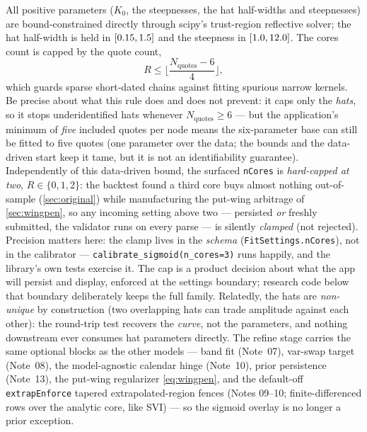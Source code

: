 \documentclass[11pt]{article}
\begin{document}
All positive parameters ($K_0$, the steepnesses, the hat half-widths and
steepnesses) are bound-constrained directly through scipy's trust-region
reflective solver; the hat half-width is held in $[0.15,1.5]$ and the
steepness in $[1.0,12.0]$. The cores count is capped by the
quote count,
\begin{equation}
R\le\Big\lfloor\frac{N_{\text{quotes}}-6}{4}\Big\rfloor,
\label{eq:identifiability}
\end{equation}
which guards sparse short-dated chains against fitting spurious narrow
kernels. Be precise about what this rule does and does not prevent: it caps
only the \emph{hats}, so it stops underidentified hats whenever
$N_{\text{quotes}}\ge6$ --- but the application's minimum of \emph{five}
included quotes per node means the six-parameter base can still be fitted to
five quotes (one parameter over the data; the bounds and the data-driven
start keep it tame, but it is not an identifiability guarantee). Independently
of this data-driven bound, the surfaced \texttt{nCores} is \emph{hard-capped
at two}, $R\in\{0,1,2\}$: the backtest found a third core buys almost nothing
out-of-sample (\cref{sec:original}) while manufacturing the put-wing arbitrage
of \cref{sec:wingpen}, so any incoming setting above two --- persisted
\emph{or} freshly submitted, the validator runs on every parse --- is silently
\emph{clamped} (not rejected). Precision matters here: the clamp lives in the
\emph{schema} (\texttt{FitSettings.nCores}), not in the calibrator ---
\texttt{calibrate\_sigmoid(n\_cores=3)} runs happily, and the library's own
tests exercise it. The cap is a product decision about what the app will
persist and display, enforced at the settings boundary; research code below
that boundary deliberately keeps the full family. Relatedly, the hats are
\emph{non-unique} by construction (two overlapping hats can trade amplitude
against each other): the round-trip test recovers the \emph{curve}, not the
parameters, and nothing downstream ever consumes hat parameters directly. The
refine stage carries the same optional blocks as the other models --- band fit
(Note~07), var-swap target (Note~08), the model-agnostic calendar hinge
(Note~10), prior persistence (Note~13), the put-wing regularizer
\eqref{eq:wingpen}, and the default-off \texttt{extrapEnforce} tapered
extrapolated-region fences (Notes 09--10; finite-differenced rows over the
analytic core, like SVI) --- so the sigmoid overlay is no longer a prior
exception.
\end{document}
